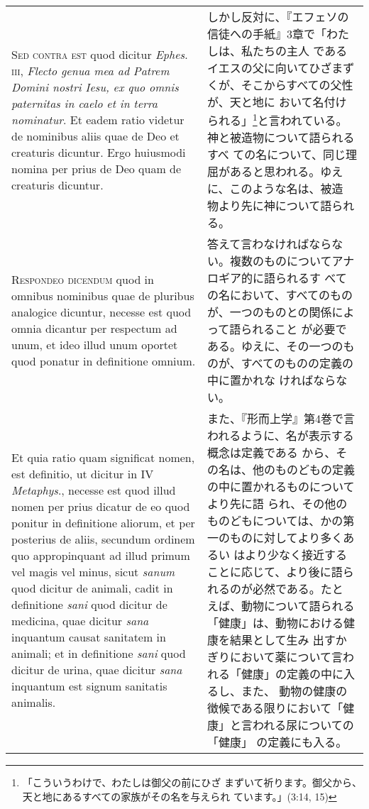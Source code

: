 \documentclass[paper=a4paper,fontsize=10pt,jafontsize=9pt,titlepage]{jlreq}
\begin{document}
\begin{longtable}{p{21em}p{21em}}
\\

{\scshape Sed contra est} quod dicitur {\itshape Ephes}.~{\scshape
iii}, {\itshape Flecto genua mea ad Patrem Domini nostri Iesu, ex quo
omnis paternitas in caelo et in terra nominatur}. Et eadem ratio
videtur de nominibus aliis quae de Deo et creaturis dicuntur. Ergo
huiusmodi nomina per prius de Deo quam de creaturis dicuntur.

&

しかし反対に、『エフェソの信徒への手紙』3章で「わたしは、私たちの主人
であるイエスの父に向いてひざまずくが、そこからすべての父性が、天と地に
おいて名付けられる」\footnote{「こういうわけで、わたしは御父の前にひざ
まずいて祈ります。御父から、天と地にあるすべての家族がその名を与えられ
ています。」(3:14, 15) }と言われている。神と被造物について語られるすべ
ての名について、同じ理屈があると思われる。ゆえに、このような名は、被造
物より先に神について語られる。

\\

{\scshape Respondeo dicendum} quod in omnibus nominibus quae de
pluribus analogice dicuntur, necesse est quod omnia dicantur per
respectum ad unum, et ideo illud unum oportet quod ponatur in
definitione omnium.

&

答えて言わなければならない。複数のものについてアナロギア的に語られるす
べての名において、すべてのものが、一つのものとの関係によって語られること
が必要である。ゆえに、その一つのものが、すべてのものの定義の中に置かれな
ければならない。

\\

Et quia ratio quam significat nomen, est definitio, ut dicitur in IV
{\itshape Metaphys}., necesse est quod illud nomen per prius dicatur
de eo quod ponitur in definitione aliorum, et per posterius de aliis,
secundum ordinem quo appropinquant ad illud primum vel magis vel
minus, sicut {\itshape sanum} quod dicitur de animali, cadit in
definitione {\itshape sani} quod dicitur de medicina, quae dicitur
{\itshape sana} inquantum causat sanitatem in animali; et in
definitione {\itshape sani} quod dicitur de urina, quae dicitur
{\itshape sana} inquantum est signum sanitatis animalis.

&

また、『形而上学』第4巻で言われるように、名が表示する概念は定義である
から、その名は、他のものどもの定義の中に置かれるものについてより先に語
られ、その他のものどもについては、かの第一のものに対してより多くあるい
はより少なく接近することに応じて、より後に語られるのが必然である。たと
えば、動物について語られる「健康」は、動物における健康を結果として生み
出すかぎりにおいて薬について言われる「健康」の定義の中に入るし、また、
動物の健康の徴候である限りにおいて「健康」と言われる尿についての「健康」
の定義にも入る。


\end{longtable}
\end{document}
